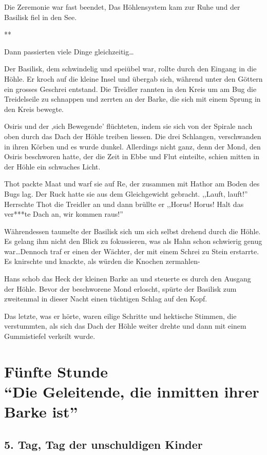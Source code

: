 \documentclass[11pt,titlepage,a5paper]{book}
\newcommand{\sterne}{\par{\centering ***\par}}
\begin{document}
Die Zeremonie war fast beendet, Das Höhlensystem kam zur Ruhe und der Basilisk fiel in den See.

\sterne

Dann passierten viele Dinge gleichzeitig\dots

Der Basilisk, dem schwindelig und speiübel war, rollte durch den Eingang in die Höhle. Er kroch auf die kleine Insel und übergab sich, während unter den Göttern ein grosses Geschrei entstand. Die Treidler rannten in den Kreis um am Bug die Treidelseile zu schnappen und zerrten an der Barke, die sich mit einem Sprung in den Kreis bewegte. 

Osiris und der ,sich Bewegende' flüchteten, indem sie sich von der Spirale nach oben durch das Dach der Höhle treiben liessen. Die drei Schlangen, verschwanden in ihren Körben und es wurde dunkel. Allerdings nicht ganz, denn der Mond, den Osiris beschworen hatte, der die Zeit in Ebbe und Flut einteilte, schien mitten in der Höhle ein schwaches Licht.

Thot packte Maat und warf sie auf Re, der zusammen mit Hathor am Boden des Bugs lag. Der Ruck hatte sie aus dem Gleichgewicht gebracht. ,,Lauft, lauft!'' Herrschte Thot die Treidler an und dann brüllte er ,,Horus! Horus! Halt das ver***te Dach an, wir kommen raus!''

Währendessen taumelte der Basilisk sich um sich selbst drehend durch die Höhle. Es gelang ihm nicht den Blick zu fokussieren, was als Hahn schon schwierig genug war\dots Dennoch traf er einen der Wächter, der mit einem Schrei zu Stein erstarrte. Es knirschte und knackte, als würden die Knochen zermahlen-

Hans schob das Heck der kleinen Barke an und steuerte es durch den Ausgang der Höhle. Bevor der beschworene Mond erloscht, spürte der Basilisk zum zweitenmal in dieser Nacht einen tüchtigen Schlag auf den Kopf. 

Das letzte, was er hörte, waren eilige Schritte und hektische Stimmen, die verstummten, als sich das Dach der Höhle weiter drehte und dann mit einem Gummistiefel verkeilt wurde.


\part*{Fünfte Stunde\\"`Die Geleitende, die inmitten ihrer Barke ist"'}

\chapter*{5. Tag, Tag der unschuldigen Kinder}
\end{document}
